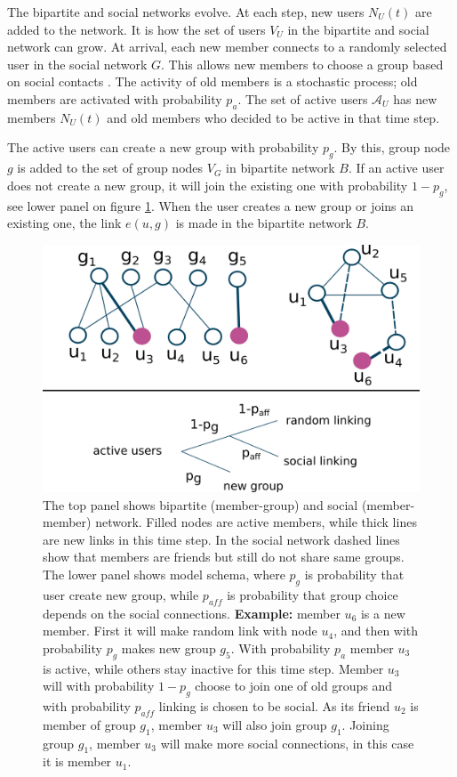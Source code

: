 The bipartite and social networks evolve. At each step, new users $N_U(t)$ are added to the network. It is how the set of users $V_U$ in the bipartite and social network can grow. At arrival, each new member connects to a randomly selected user in the social network $G$. This allows new members to choose a group based on social contacts \cite{kairam2012life}. The activity of old members is a stochastic process; old members are activated with probability $p_a$. The set of active users $\mathcal{A}_{U}$ has new members $N_U(t)$ and old members who decided to be active in that time step.

The active users can create a new group with probability $p_g$. By this, group node $g$ is added to the set of group nodes $V_G$ in bipartite network $B$. If an active user does not create a new group, it will join the existing one with probability $1-p_g$, see lower panel on figure \ref{fig:schema}. When the user creates a new group or joins an existing one, the link $e(u,g)$ is made in the bipartite network $B$.

\begin{figure}[h]
	\centering
	\includegraphics[scale=0.5]{Figures/figures/test.png}
	\caption[Bipartite groups growth model]{The top panel shows bipartite (member-group) and social (member-member) network. Filled nodes are active members, while thick lines are new links in this time step. In the social network dashed lines show that members are friends but still do not share same groups. The lower panel shows model schema, where $p_g$ is probability that user create new group, while $p_{aff}$ is probability that group choice depends on the social connections. \textbf{Example:} member $u_6$ is a new member. First it will make random link  with node $u_4$, and then with probability $p_g$ makes new group $g_5$. With probability $p_a$ member $u_3$ is active, while others stay inactive for this time step. Member $u_3$ will with probability $1-p_g$ choose to join one of old groups and with probability $p_{aff}$ linking is chosen to be social. As its friend $u_2$ is member of group $g_1$, member $u_3$ will also join group $g_1$. Joining group $g_1$, member $u_3$ will make more social connections, in this case it is member $u_1$.}
	\label{fig:schema}
\end{figure}

